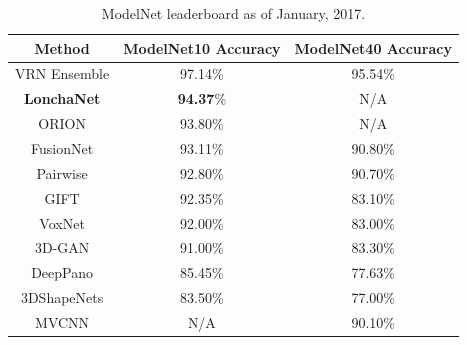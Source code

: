 \begin{table}[!b]
	\centering
	\begin{tabular}{ccc}
    	Method & ModelNet10 Accuracy & ModelNet40 Accuracy\\
        \hline
        VRN Ensemble \cite{Brock2016} & 97.14\% & 95.54\%\\
        \textbf{LonchaNet} & \textbf{94.37}\% & N/A\\
        ORION \cite{Sedaghat2016} & 93.80\% & N/A\\
        FusionNet \cite{Hegde2016} & 93.11\% & 90.80\% \\
        Pairwise \cite{Johns2016} & 92.80\% & 90.70\% \\
        GIFT \cite{Bai2016} & 92.35\% & 83.10\% \\
        VoxNet \cite{Maturana2015} & 92.00\% & 83.00\% \\
        3D-GAN \cite{Wu2016} & 91.00\% & 83.30\% \\
        DeepPano \cite{Shi2015} & 85.45\% & 77.63\% \\
        3DShapeNets \cite{Wu2015} & 83.50\% & 77.00\% \\
        MVCNN \cite{Su2015} & N/A & 90.10\% \\
        \hline
    \end{tabular}
    \caption{ModelNet leaderboard as of January, 2017.}
    \label{table:objrecog:modelnet_leaderboard}
\end{table}